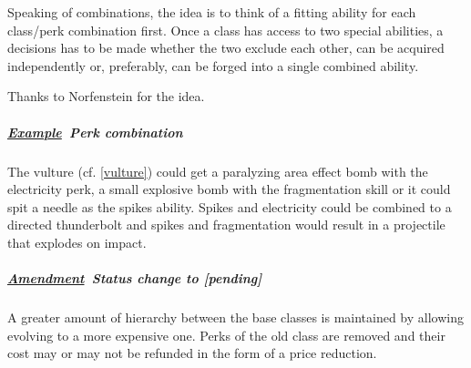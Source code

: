 \documentclass{scrartcl}
\newcommand{\pending}  [0]{\textcolor{pending}  {\textbf{[pending] }}}
\newcommand{\example}  [0]{\textbf{\underline{Example}\ }}
\newcommand{\amendment}[0]{\textbf{\underline{Amendment}\ }}
\begin{document}
Speaking of combinations, the idea is to think of a fitting ability for each class/perk combination first. Once a class has access to two special abilities, a decisions has to be made whether the two exclude each other, can be acquired independently or, preferably, can be forged into a single combined ability.

Thanks to Norfenstein for the idea.

\subparagraph{\example Perk combination}

The vulture (cf. \ref{vulture}) could get a paralyzing area effect bomb with the electricity perk, a small explosive bomb with the fragmentation skill or it could spit a needle as the spikes ability. Spikes and electricity could be combined to a directed thunderbolt and spikes and fragmentation would result in a projectile that explodes on impact.

\subparagraph{\amendment Status change to \pending}

A greater amount of hierarchy between the base classes is maintained by allowing evolving to a more expensive one. Perks of the old class are removed and their cost may or may not be refunded in the form of a price reduction.
\end{document}
